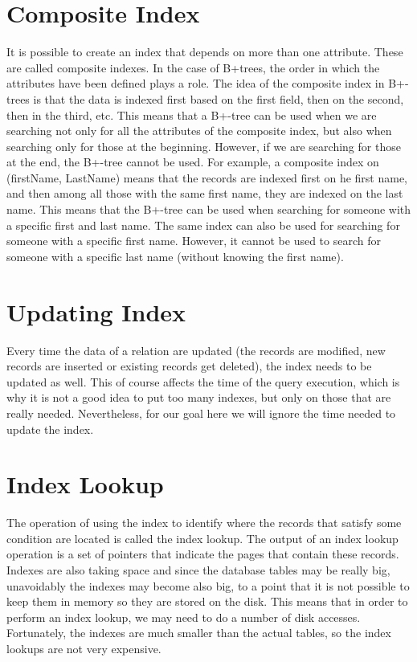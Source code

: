 \documentclass[11pt]{article}
\begin{document}
\section{Composite Index}

It is possible to create an index that depends on more than one attribute. These are called composite indexes. In the case of B+trees, the order in which the attributes have been defined plays a role. The idea of the composite index in B+-trees is that the data is indexed first based on the first field, then on the second, then in the third, etc. This means that a B+-tree can be used when we are searching not only for all the attributes of the composite index, but also when searching only for those at the beginning. However, if we are searching for those at the end, the B+-tree cannot be used. For example, a composite index on (firstName, LastName) means that the records are indexed first on he first name, and then among all those with the same first name, they are indexed on the last name. This means that the B+-tree can be used when searching for someone with a specific first and last name. The same index can also be used for searching for someone with a specific first name. However, it cannot be used to search for someone with a specific last name (without knowing the first name).

\section{Updating Index}

Every time the data of a relation are updated (the records are modified, new records are inserted or existing records get deleted), the index needs to be updated as well. This of course affects the time of the query execution, which is why it is not a good idea to put too many indexes, but only on those that are really needed. Nevertheless, for our goal here we will ignore the time needed to update the index.

\section{Index Lookup}

The operation of using the index to identify where the records that satisfy some condition are located is called the index lookup. The output of an index lookup operation is a set of pointers that indicate the pages that contain these records.
Indexes are also taking space and since the database tables may be really big, unavoidably the indexes may become also big, to a point that it is not possible to keep them in memory so they are stored on the disk. This means that in order to perform an index lookup, we may need to do a number of disk accesses. Fortunately, the indexes are much smaller than the actual tables, so the index lookups are not very expensive.
\end{document}
